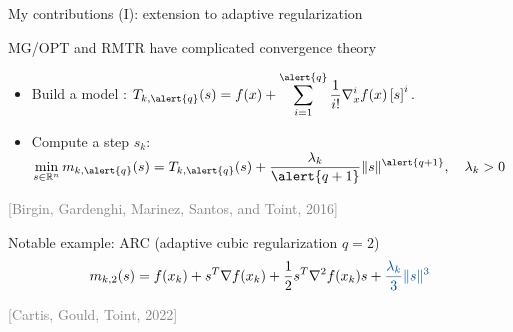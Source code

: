 \documentclass{beamer}
\begin{document}
\begin{frame}{My contributions (I): extension to adaptive regularization  }


\begin{footnotesize}
\begin{tcolorbox}[
        title={\faExclamationTriangle\ Limitation},
    colback=red!10,
    colframe=red!70!black,
        fonttitle=\bfseries,
]
MG/OPT and RMTR have complicated convergence theory

\end{tcolorbox}
\end{footnotesize}


	\begin{tcolorbox}[
	 title=AR$q$:  adaptive regularization methods of order $q\geq 1$,
    colback=gray!15,
    colframe=gray!50,
    arc=3mm,
    boxrule=0pt
]


	
	 
	\footnotesize{
	\begin{itemize}
	\item  Build a model :
	$\displaystyle
	 T_{k,\alert{q}}(s)=f(x)+\sum_{i=1}^{\alert{q}}\frac{1}{i!}\nabla_x^i f(x)\left[ s\right]^i.
	 $
	

	\item Compute a step $s_k$: $\displaystyle{
	\min_{s\in\mathbb{R}^n} m_{k,\alert{q}}(s)=T_{k,\alert{q}}(s)+\frac{\lambda_k}{\alert{q+1}}\|s\|^{\alert{q+1}},\quad \lambda_k>0}
$


	\end{itemize}}
\end{tcolorbox}

\vspace{-0.2cm}


{\tiny
\parbox{\linewidth}{%
\textcolor{gray}{%
[Birgin, Gardenghi, Marinez, Santos, and Toint,
2016]}}
}


\vspace{-0.5cm}
		
		\begin{tcolorbox}[
    colback=gray!15,
    colframe=gray!50,
    arc=3mm,
    boxrule=0pt
]
	\footnotesize{Notable example: \textcolor{myblue}{ARC} (adaptive cubic regularization \textcolor{myblue}{$q=2$})
		$$
		m_{k,2}(s)=f(x_k)+s^T\nabla f(x_k)+\frac{1}{2}s^T\nabla^2f(x_k)s+\textcolor{myblue}{\frac{\lambda_k}{3}\|s\|^{3}}
$$}
		
		\end{tcolorbox}	
		\vspace{-0.2cm}

		{\tiny
\parbox{\linewidth}{%
\textcolor{gray}{%
[Cartis, Gould, Toint,
2022]}}
}

		
		
		\end{frame}
		
\end{document}
